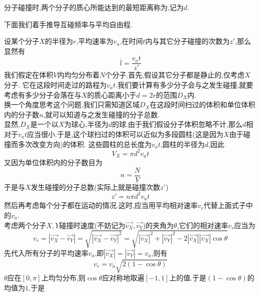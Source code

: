 \documentclass{ctexart}
\begin{document}
\begin{definition}[1B.4.2 有效直径]
    分子碰撞时,两个分子的质心所能达到的最短距离称为,记为$d$.
\end{definition}
下面我们着手推导互碰频率与平均自由程.
\begin{derivation}
    设某个分子$X$的半径为$r$,平均速率为$v_a$,在时间$t$内与其它分子碰撞的次数为$z'$,那么显然有
    \begin{equation}
        \overline{l}=\dfrac{v_at}{z'}
    \end{equation}
    我们假定在体积$V$内均匀分布着$N$个分子.首先,假设其它分子都是静止的,仅考虑$X$分子.%
    它在这段时间走过的路程为$v_at$.我们要计算有多少分子会与之发生碰撞,就要考虑有多少分子会落在与$X$的质心距离小于$d=2r$的范围$D_X$内.\\
    换一个角度思考这个问题,我们只需知道区域$D_X$在这段时间扫过的体积和单位体积内的分子数$n$,就可以知道与之发生碰撞的分子总数.\\
    显然,$D_X$是一个以$X$为球心,半径为$d$的球.由于我们假设分子体积忽略不计,那么$d$相对于$v_at$应当很小.于是,这个球扫过的体积可以近似为多段圆柱(这是因为$X$由于碰撞而多次改变方向)的体积.%
    这些圆柱的总长度为$v_at$,圆柱的半径为$d$,因此
    \begin{equation}
        V_X=\pi d^2v_at
    \end{equation}
    又因为单位体积内的分子数目为
    \begin{equation}
        n=\dfrac{N}{V}
    \end{equation}
    于是与$X$发生碰撞的分子总数(实际上就是碰撞次数$z'$)
    \begin{equation}
        z'=n\pi d^2v_at
    \end{equation}
    然后再考虑每个分子都在运动的情况.这时,应当用平均相对速率$v_r$代替上面式子中的$v_a$.\\
    考虑两个分子$X,Y$碰撞时速度(不妨记为$\overrightarrow{v_X},\overrightarrow{v_Y}$)的夹角为$\theta$,它们的相对速率$v_r$应当为
    \[v_r=\left|\overrightarrow{v_X}-\overrightarrow{v_Y}\right|
    =\sqrt{\left|\overrightarrow{v_X}-\overrightarrow{v_Y}\right|^2}
    =\sqrt{\left|\overrightarrow{v_X}\right|^2+\left|\overrightarrow{v_Y}\right|^2-2\left|\overrightarrow{v_X}\right|\left|\overrightarrow{v_X}\right|\cos\theta}\]
    先代入所有分子的平均速率$v_a$,即$\left|\overrightarrow{v_X}\right|=\left|\overrightarrow{v_Y}\right|=v_a$,则有
    \[v_r=v_a\sqrt{2\left(1-\cos\theta\right)}\]
    $\theta$应在$[0,\pi]$上均匀分布,则$\cos\theta$应对称地取遍$[-1,1]$上的值.于是$(1-\cos\theta)$的均值为$1$,于是
    \begin{equation}

\end{equation}
\end{derivation}
\end{document}
